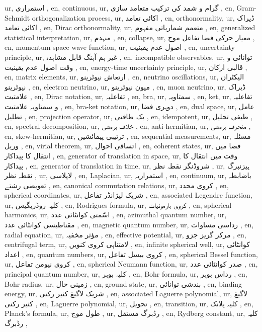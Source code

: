 ur, استمراری ,
en, continuous,
ur, گرام و شمد کی ترکیب متعامد سازی ,
en, Gram-Schmidt orthogonalization process,
ur, اکائی تعامد  ,
en, orthonormality,
ur, ڈیراک اکائی تعامد ,
en, Dirac orthonormality,
ur,  متعمم شماریاتی مفہوم ,
en, generalized statistical interpretation,
ur, منہدم ,
en, collapse,
ur,  معیار حرکی فضا تفاعل موج ,
en, momentum space wave function,
ur, اصول عدم یقینیت ,
en, uncertainty principle,
ur, غیر ہم آہنگ قابل مشاہدہ ,
en, incompatible observables,
ur, توانائی و وقت اصول عدم یقینیت ,
en, energy-time uncertainty principle,
ur, قالبی ارکان ,
en, matrix elements,
ur,  ارتعاش نیوٹرینو ,
en, neutrino oscillations,
ur,  الیکٹران نیوٹرینو ,
en, electron neutrino,
ur,  میون نیوٹرینو ,
en, muon neutrino,
ur, ڈیراک علامتیت ,
en, Dirac notation,
ur, تفاعلیہ ,
en, bra,
ur, سمتاویہ ,
en, ket,
ur, تفاعلیہ و سمتاویہ علامتیت ,
en, bra-ket notation,
ur,  دوہری فضا ,
en, dual space,
ur, عامل تظلیل ,
en, projection operator,
ur, یک طاقتی ,
en, idempotent,
ur,  طیفی تحلیل ,
en, spectral decomposition,
ur, خلاف ہرمشی ,
en, anti-hermitian,
ur, منحرف ہرمشی ,
en, skew-hermitian,
ur, ترتیبی پیمائشیں ,
en, sequential measurements,
ur, مسئلہ وریل ,
en, virial theorem,
ur,  اتساقی احوال ,
en, coherent states,
ur, فضا میں انتقال کا پیداکار ,
en, generator of translation in space,
ur,  وقت میں انتقال کا پیداکار ,
en, generator of translation in time,
ur, شروڈنگر نقطہ نظر ,
ur, ہیزنبرگ نقطہ نظر ,
ur, لاپلاسی ,
en, Laplacian,
ur, استمراریہ ,
en, continuum,
ur, باضابطہ تعویضی رشتے ,
en, canonical commutation relations,
ur, کروی محدد ,
en, spherical coordinates,
ur, شریک لیژانڈر تفاعل ,
en, associated Legendre function,
ur, کلیہ روڈریگیس ,
en, Rodrigues formula,
ur, کروی ہارمونیات ,
en, spherical harmonics,
ur, اسّمتی کوانٹائی عدد ,
en, azimuthal quantum number,
ur, مقناطیسی کوانٹائی عدد ,
en, magnetic quantum number,
ur, رداسی مساوات ,
en, radial equation,
ur, مؤثر مخفیہ ,
en, effective potential,
ur, مرکز گریز جزو ,
en, centrifugal term,
ur, لامتناہی کروی کنویں ,
en, infinite spherical well,
ur, کوانٹائی اعداد ,
en, quantum numbers,
ur, کروی بیسل تفاعل ,
en, spherical Bessel function,
ur, کروی نیومن تفاعل ,
en, spherical Neumann function,
ur, صدر کوانٹائی عدد ,
en, principal quantum number,
ur, کلیہ بوہر ,
en, Bohr formula,
ur, رداس بوہر ,
en, Bohr radius,
ur, زمینی حال ,
en, ground state,
ur, بندشی توانائی ,
en, binding energy,
ur, شریک لاگیغ کثیر رکنی ,
en, associated Laguerre polynomial,
ur, لاگیغ کثیر رکنی ,
en, Laguerre polynomial,
ur, تحویل ,
en, transition,
ur, کلیہ پلانک ,
en, Planck's formula,
ur,  طول موج ,
ur, رڈبرگ مستقل ,
en, Rydberg constant,
ur, کلیہ رڈبرگ ,
